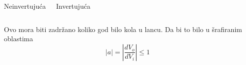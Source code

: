 \begin{frame}[label=08-s016]
\centering\gusttekst
\begin{columns}[T,onlytextwidth]\centering
Neinvertujuća\par\par
{}\centering
Invertujuća\par\par
\end{columns}\medskip
Ovo mora biti zadržano koliko god bilo kola u lancu. Da bi to bilo u šrafiranim oblastima
\[|a|=\left|\frac{dV_o}{dV_i}\right|\leq1\]
\end{frame}
